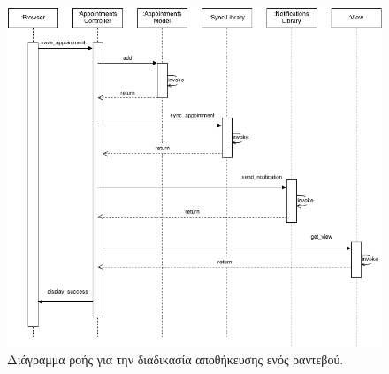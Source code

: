 \begin{figure}%
\centering
\includegraphics[width=150mm]{images/sd-save-appointment.png}
\caption{Διάγραμμα ροής για την διαδικασία αποθήκευσης ενός ραντεβού.}
\label{sd-save-appointment}
\end{figure}

